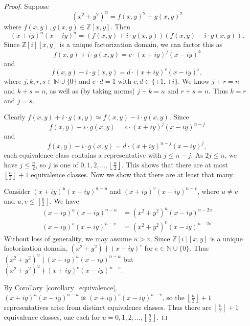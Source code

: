 \documentclass[12pt]{article}
\theoremstyle{definition}
\newcommand{\Nnn}{\mathbb N}
\newcommand{\Zzz}{\mathbb Z}
\newcommand{\divides}{\mid}
\newcommand{\notdivides}{\nmid}
\numberwithin{equation}{section}
\begin{document}
\begin{proof}
Suppose 
\[ (x^2 + y^2)^n = f(x,y)^2 + g(x,y)^2 \]
where \( f(x,y), g(x,y) \in \Zzz[x,y] \).
Then  
\[ (x + iy)^n (x -  iy)^n = ( f(x,y) + i \cdot g(x,y) ) ( f(x,y) - i \cdot g(x,y) ) .\]
Since \( \Zzz [i][x,y] \) is a unique factorization domain,
we can factor this as
\[ f(x,y) + i \cdot g(x,y) = c \cdot (x + iy)^j (x -  iy)^k \]
and
\[ f(x,y) - i \cdot g(x,y) = d \cdot (x + iy)^r (x -  iy)^s,\]
where \( j, k, r, s \in \Nnn \cup \{0\} \) and
\(c \cdot d = 1 \) with \( c,d \in \{ \pm 1 , \pm i \} \). 
We know \( j + r = n \) and \( k + s = n \), as well as
(by taking norms) \( j + k = n \) and \( r + s = n \).
Thus \(k = r\) and \(j = s\).

Clearly \( f(x,y) + i \cdot g(x,y) \simeq  f(x,y) - i \cdot g(x,y) \).
Since 
\[ 
f(x,y) + i \cdot g(x,y) = c \cdot (x + iy)^j (x -  iy)^{n-j} 
\]
and 
\[ 
f(x,y) - i \cdot g(x,y) = d \cdot (x + iy)^{n-j} (x -  iy)^j,
\]
each equivalence class contains a representative with \( j \leq n - j
\).  As \( 2j \leq n \), we have \( j \leq \frac{n}{2} \), so \( j \)
is one of \( 0, 1, 2, \ldots, \left\lfloor \frac{n}{2} \right\rfloor \). This shows
that there are at most \( \left\lfloor \frac{n}{2} \right\rfloor + 1 \)
equivalence classes. Now we show that there are at least that many.



Consider \( (x + iy)^u (x -  iy)^{n-u} \)  and \( (x + iy)^v (x -  iy)^{n-v} \),
where \( u \neq v \) and \(u,v \leq [ \frac{n}{2} ] \). We have
\begin{align*}
(x + iy)^u (x -  iy)^{n-u} &= (x^2 + y^2)^u (x -  iy)^{n-2u}
\\
(x + iy)^v (x -  iy)^{n-v} &= (x^2 + y^2)^v (x -  iy)^{n-2v}
\end{align*}
Without loss of generality, we may assume \( u > v \). 
Since \( \Zzz [i][x,y] \) is a unique factorization domain,
\( (x^2 + y^2) \notdivides (x -  iy)^e \) for \( e \in \Nnn \cup \{ 0 \} \).
Thus \( (x^2 + y^2)^u \divides (x + iy)^u (x -  iy)^{n-u} \)
but \( (x^2 + y^2)^u \notdivides (x + iy)^v (x -  iy)^{n-v} \).

By Corollary~\ref{corollary_equivalence},
\( (x + iy)^u (x -  iy)^{n-u} \not\simeq (x + iy)^v (x -  iy)^{n-v} \), 
so the \( \left\lfloor \frac{n}{2} \right\rfloor + 1 \) representatives arise from
distinct equivalence classes.
Thus there are \( \left\lfloor \frac{n}{2} \right\rfloor + 1 \) equivalence classes, 
one each for \( u = 0, 1, 2, \ldots,  \left\lfloor \frac{n}{2} \right\rfloor \).
\end{proof}
\end{document}
